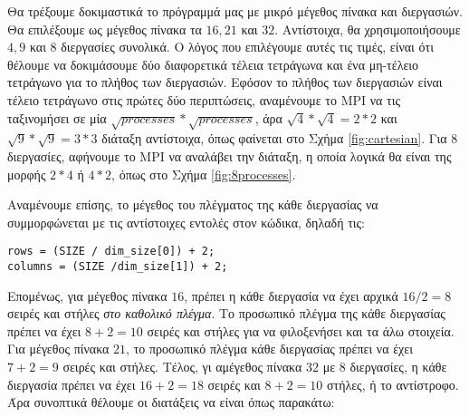 \begin{multicols}{2}
Θα τρέξουμε δοκιμαστικά το πρόγραμμά μας με μικρό μέγεθος πίνακα και διεργασιών. Θα επιλέξουμε ως μέγεθος πίνακα τα $16, 21$ και $32$. Αντίστοιχα, θα χρησιμοποιήσουμε $4, 9$ και $8$ διεργασίες συνολικά. Ο λόγος που επιλέγουμε αυτές τις τιμές, είναι ότι θέλουμε να δοκιμάσουμε δύο διαφορετικά τέλεια τετράγωνα και ένα μη-τέλειο τετράγωνο για το πλήθος των διεργασιών. Εφόσον το πλήθος των διεργασιών είναι τέλειο τετράγωνο στις πρώτες δύο περιπτώσεις, αναμένουμε το MPI να τις ταξινομήσει σε μία $\sqrt{processes} * \sqrt{processes}$, άρα $\sqrt{4} * \sqrt{4} = 2 * 2$ και $\sqrt{9} * \sqrt{9} = 3 * 3$ διάταξη αντίστοιχα, όπως φαίνεται στο Σχήμα \ref{fig:cartesian}. Για $8$ διεργασίες, αφήνουμε το MPI να αναλάβει την διάταξη, η οποία λογικά θα είναι της μορφής $2*4$ ή $4*2$, όπως στο Σχήμα \ref{fig:8processes}. \par
Αναμένουμε επίσης, το μέγεθος του πλέγματος της κάθε διεργασίας να συμμορφώνεται με τις αντίστοιχες εντολές στον κώδικα, δηλαδή τις:
\begin{verbatim}
rows = (SIZE / dim_size[0]) + 2;
columns = (SIZE /dim_size[1]) + 2;
\end{verbatim}

Επομένως, για μέγεθος πίνακα $16$, πρέπει η κάθε διεργασία να έχει αρχικά $16/2=8$ σειρές και στήλες \emph{στο καθολικό πλέγμα}. Το προσωπικό πλέγμα της κάθε διεργασίας πρέπει να έχει $8+2=10$ σειρές και στήλες για να φιλοξενήσει και τα άλω στοιχεία. Για μέγεθος πίνακα $21$, το προσωπικό πλέγμα κάθε διεργασίας πρέπει να έχει $7+2=9$ σειρές και στήλες. Τέλος, γι αμέγεθος πίνακα $32$ με $8$ διεργασίες, η κάθε διεργασία πρέπει να έχει $16+2=18$ σειρές και $8+2=10$ στήλες, ή το αντίστροφο. Άρα συνοπτικά θέλουμε οι διατάξεις να είναι όπως παρακάτω:
\end{multicols}


